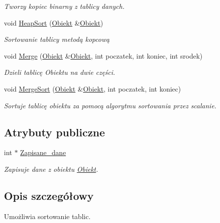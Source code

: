 \begin{DoxyCompactItemize}
\begin{DoxyCompactList}\small\item\em \-Tworzy kopiec binarny z tablicy danych. \end{DoxyCompactList}\item 
void \hyperlink{class_sort_a3277f2254bc78a16e7e85a278c322a8a}{\-Heap\-Sort} (\hyperlink{class_obiekt}{\-Obiekt} \&\hyperlink{class_obiekt}{\-Obiekt})
\begin{DoxyCompactList}\small\item\em \-Sortowanie tablicy metodą kopcową \end{DoxyCompactList}\item 
void \hyperlink{class_sort_a28ad6588d4dc4476d2733ca886106a02}{\-Merge} (\hyperlink{class_obiekt}{\-Obiekt} \&\hyperlink{class_obiekt}{\-Obiekt}, int poczatek, int koniec, int srodek)
\begin{DoxyCompactList}\small\item\em \-Dzieli tablicę \-Obiektu na dwie części. \end{DoxyCompactList}\item 
void \hyperlink{class_sort_adcff6c89311454b862df617e8d8e6dfd}{\-Merge\-Sort} (\hyperlink{class_obiekt}{\-Obiekt} \&\hyperlink{class_obiekt}{\-Obiekt}, int poczatek, int koniec)
\begin{DoxyCompactList}\small\item\em \-Sortuje tablicę obiektu za pomocą algorytmu sortowania przez scalanie. \end{DoxyCompactList}\end{DoxyCompactItemize}
\subsection*{\-Atrybuty publiczne}
\begin{DoxyCompactItemize}
\item 
int $\ast$ \hyperlink{class_sort_a6cb891a8e545fdb636d10bec406fef32}{\-Zapisane\-\_\-dane}
\begin{DoxyCompactList}\small\item\em \-Zapisuje dane z obiektu \hyperlink{class_obiekt}{\-Obiekt}. \end{DoxyCompactList}\end{DoxyCompactItemize}


\subsection{\-Opis szczegółowy}
\-Umożliwia sortowanie tablic. 

